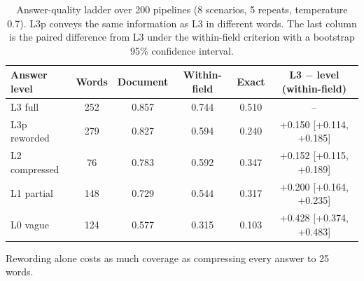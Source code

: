 \begin{table}[t]
\caption{Answer-quality ladder over 200 pipelines (8 scenarios, 5 repeats, temperature 0.7). L3p conveys the same information as L3 in different words. The last column is the paired difference from L3 under the within-field criterion with a bootstrap 95\% confidence interval.}
\label{tab:answer-ladder}
\centering
\small
\begin{tabular}{lccccc}
\toprule
Answer level & Words & Document & Within-field & Exact & L3 $-$ level (within-field) \\
\midrule
L3 full & 252 & 0.857 & 0.744 & 0.510 & -- \\
L3p reworded & 279 & 0.827 & 0.594 & 0.240 & +0.150 [+0.114, +0.185] \\
L2 compressed & 76 & 0.783 & 0.592 & 0.347 & +0.152 [+0.115, +0.189] \\
L1 partial & 148 & 0.729 & 0.544 & 0.317 & +0.200 [+0.164, +0.235] \\
L0 vague & 124 & 0.577 & 0.315 & 0.103 & +0.428 [+0.374, +0.483] \\
\bottomrule
\end{tabular}
\par\vspace{2pt}\footnotesize Rewording alone costs as much coverage as compressing every answer to 25 words.
\end{table}

